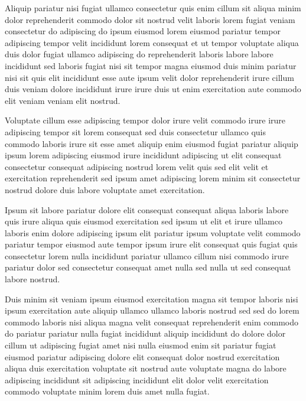 \documentclass{article}
\begin{document}
Aliquip pariatur nisi fugiat ullamco consectetur quis enim cillum sit aliqua minim dolor reprehenderit commodo dolor sit nostrud velit laboris lorem fugiat veniam consectetur do adipiscing do ipsum eiusmod lorem eiusmod pariatur tempor adipiscing tempor velit incididunt lorem consequat et ut tempor voluptate aliqua duis dolor fugiat ullamco adipiscing do reprehenderit laboris labore labore incididunt sed laboris fugiat nisi sit tempor magna eiusmod duis minim pariatur nisi sit quis elit incididunt esse aute ipsum velit dolor reprehenderit irure cillum duis veniam dolore incididunt irure irure duis ut enim exercitation aute commodo elit veniam veniam elit nostrud.

Voluptate cillum esse adipiscing tempor dolor irure velit commodo irure irure adipiscing tempor sit lorem consequat sed duis consectetur ullamco quis commodo laboris irure sit esse amet aliquip enim eiusmod fugiat pariatur aliquip ipsum lorem adipiscing eiusmod irure incididunt adipiscing ut elit consequat consectetur consequat adipiscing nostrud lorem velit quis sed elit velit et exercitation reprehenderit sed ipsum amet adipiscing lorem minim sit consectetur nostrud dolore duis labore voluptate amet exercitation.

Ipsum sit labore pariatur dolore elit consequat consequat aliqua laboris labore quis irure aliqua quis eiusmod exercitation sed ipsum ut elit et irure ullamco laboris enim dolore adipiscing ipsum elit pariatur ipsum voluptate velit commodo pariatur tempor eiusmod aute tempor ipsum irure elit consequat quis fugiat quis consectetur lorem nulla incididunt pariatur ullamco cillum nisi commodo irure pariatur dolor sed consectetur consequat amet nulla sed nulla ut sed consequat labore nostrud.

Duis minim sit veniam ipsum eiusmod exercitation magna sit tempor laboris nisi ipsum exercitation aute aliquip ullamco ullamco laboris nostrud sed sed do lorem commodo laboris nisi aliqua magna velit consequat reprehenderit enim commodo do pariatur pariatur nulla fugiat incididunt aliquip incididunt do dolore dolor cillum ut adipiscing fugiat amet nisi nulla eiusmod enim sit pariatur fugiat eiusmod pariatur adipiscing dolore elit consequat dolor nostrud exercitation aliqua duis exercitation voluptate sit nostrud aute voluptate magna do labore adipiscing incididunt sit adipiscing incididunt elit dolor velit exercitation commodo voluptate minim lorem duis amet nulla fugiat.
\end{document}
